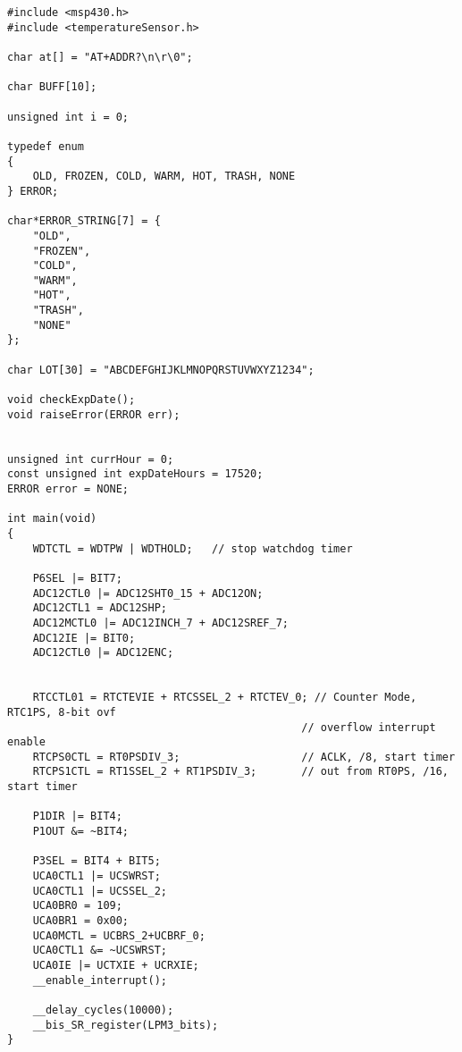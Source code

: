 \begin{code}
\label{code:sub-unit-main-func}
\begin{verbatim}
#include <msp430.h>
#include <temperatureSensor.h>

char at[] = "AT+ADDR?\n\r\0";

char BUFF[10];

unsigned int i = 0;

typedef enum
{
    OLD, FROZEN, COLD, WARM, HOT, TRASH, NONE
} ERROR;

char*ERROR_STRING[7] = {
    "OLD",
    "FROZEN",
    "COLD",
    "WARM",
    "HOT",
    "TRASH",
    "NONE"
};

char LOT[30] = "ABCDEFGHIJKLMNOPQRSTUVWXYZ1234";

void checkExpDate();
void raiseError(ERROR err);


unsigned int currHour = 0;
const unsigned int expDateHours = 17520;
ERROR error = NONE;

int main(void)
{
    WDTCTL = WDTPW | WDTHOLD;	// stop watchdog timer

    P6SEL |= BIT7;
    ADC12CTL0 |= ADC12SHT0_15 + ADC12ON;
    ADC12CTL1 = ADC12SHP;
    ADC12MCTL0 |= ADC12INCH_7 + ADC12SREF_7;
    ADC12IE |= BIT0;
    ADC12CTL0 |= ADC12ENC;


    RTCCTL01 = RTCTEVIE + RTCSSEL_2 + RTCTEV_0; // Counter Mode, RTC1PS, 8-bit ovf
                                              // overflow interrupt enable
    RTCPS0CTL = RT0PSDIV_3;                   // ACLK, /8, start timer
    RTCPS1CTL = RT1SSEL_2 + RT1PSDIV_3;       // out from RT0PS, /16, start timer

    P1DIR |= BIT4;
    P1OUT &= ~BIT4;

    P3SEL = BIT4 + BIT5;
    UCA0CTL1 |= UCSWRST;
    UCA0CTL1 |= UCSSEL_2;
    UCA0BR0 = 109;
    UCA0BR1 = 0x00;
    UCA0MCTL = UCBRS_2+UCBRF_0;
    UCA0CTL1 &= ~UCSWRST;
    UCA0IE |= UCTXIE + UCRXIE;
    __enable_interrupt();

    __delay_cycles(10000);
    __bis_SR_register(LPM3_bits);
}


\end{verbatim}
\end{code}
